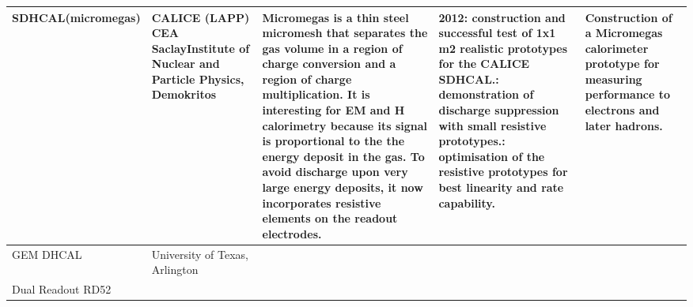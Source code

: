 \begin{landscape}
\begin{table}[h]
\begin{adjustbox}{max width=1\textwidth}
\begin{tabularx}{2\textwidth}{lXXXX}
    \midrule
    SDHCAL(micromegas) &
     CALICE (LAPP) \newline CEA Saclay\newline Institute of Nuclear and Particle Physics, Demokritos                                                            &
      Micromegas is a thin steel micromesh that separates the gas volume in a region of charge conversion and a region of charge multiplication. It is interesting for EM and H calorimetry because its signal is proportional to the the energy deposit in the gas. To avoid discharge upon very large energy deposits, it now incorporates resistive elements on the readout electrodes. &
       2012: construction and successful test of 1x1 m2 realistic prototypes for the CALICE SDHCAL.\newline
       2014: demonstration of discharge suppression with small resistive prototypes.\newline
       2015: optimisation of the resistive prototypes for best linearity and rate capability. &
       Construction of a Micromegas calorimeter prototype for measuring performance to electrons and later hadrons.                                                                                                                        \\
       \midrule
    GEM DHCAL &
     University of Texas, Arlington &                                                                                                                                                                                                                                                                                                                                                                                      &                                                                                                                                                                                                                                                                 &                                                                                                                                                                                                                                     \\
     \midrule
    Dual Readout \newline RD52                                                                                               &

\end{tabularx}
\end{adjustbox}
\end{table}
\end{landscape}
